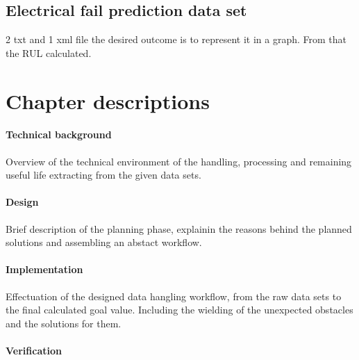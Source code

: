   \subsection{Electrical fail prediction data set}
2 txt and 1 xml file the desired outcome is to represent it in a graph. From that the RUL calculated.

\section{Chapter descriptions}
		\paragraph{Technical background}

Overview of the technical environment of the handling, processing and remaining useful life extracting from the given data sets.

		\paragraph{Design}

Brief description of the planning phase, explainin the reasons behind the planned solutions and assembling an abstact workflow.

		\paragraph{Implementation}

Effectuation of the designed data hangling workflow, from the raw data sets to the final calculated goal value. Including the wielding of the unexpected obstacles and the solutions for them.

		\paragraph{Verification}

